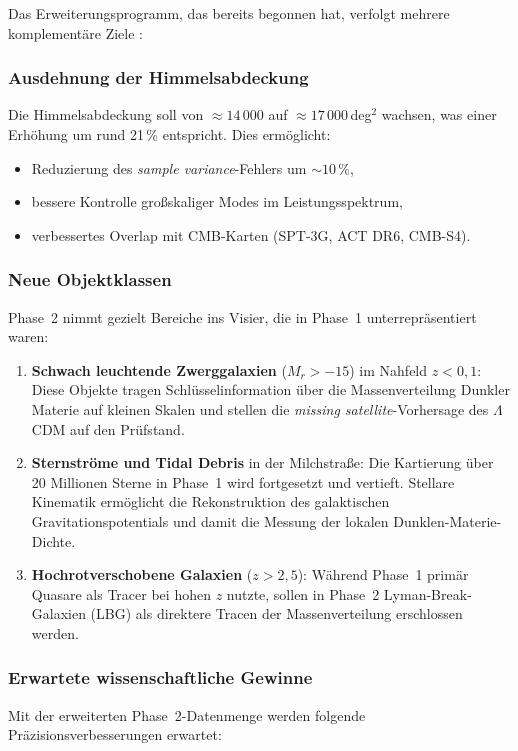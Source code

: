 ﻿\documentclass[a4paper,12pt]{article}
\theoremstyle{definition}
\theoremstyle{remark}
\begin{document}
Das Erweiterungsprogramm, das bereits begonnen hat, verfolgt mehrere
komplementäre Ziele \cite{desi2024dr1}:

\subsubsection*{Ausdehnung der Himmelsabdeckung}
Die Himmelsabdeckung soll von $\approx 14\,000$ auf $\approx 17\,000$\,deg$^2$
wachsen, was einer Erhöhung um rund 21\,\% entspricht. Dies ermöglicht:
\begin{itemize}
  \item Reduzierung des \textit{sample variance}-Fehlers um $\sim 10\,\%$,
  \item bessere Kontrolle großskaliger Modes im Leistungsspektrum,
  \item verbessertes Overlap mit CMB-Karten (SPT-3G, ACT DR6, CMB-S4).
\end{itemize}

\subsubsection*{Neue Objektklassen}
Phase~2 nimmt gezielt Bereiche ins Visier, die in Phase~1 unterrepräsentiert
waren:
\begin{enumerate}[label=\alph*)]
  \item \textbf{Schwach leuchtende Zwerggalaxien} ($M_r > -15$) im Nahfeld
    $z < 0{,}1$: Diese Objekte tragen Schlüsselinformation über die
    Massenverteilung Dunkler Materie auf kleinen Skalen und stellen die
    \textit{missing satellite}-Vorhersage des $\Lambda$CDM auf den Prüfstand.
  \item \textbf{Sternströme und Tidal Debris} in der Milchstraße: Die Kartierung
    über 20 Millionen Sterne in Phase~1 wird fortgesetzt und vertieft.
    Stellare Kinematik ermöglicht die Rekonstruktion des galaktischen
    Gravitationspotentials und damit die Messung der lokalen Dunklen-Materie-Dichte.
  \item \textbf{Hochrotverschobene Galaxien} ($z > 2{,}5$): Während Phase~1
    primär Quasare als Tracer bei hohen $z$ nutzte, sollen in Phase~2
    Lyman-Break-Galaxien (LBG) als direktere Tracen der Massenverteilung
    erschlossen werden.
\end{enumerate}

\subsubsection*{Erwartete wissenschaftliche Gewinne}
Mit der erweiterten Phase~2-Datenmenge werden folgende Präzisionsverbesserungen
erwartet:
\end{document}
